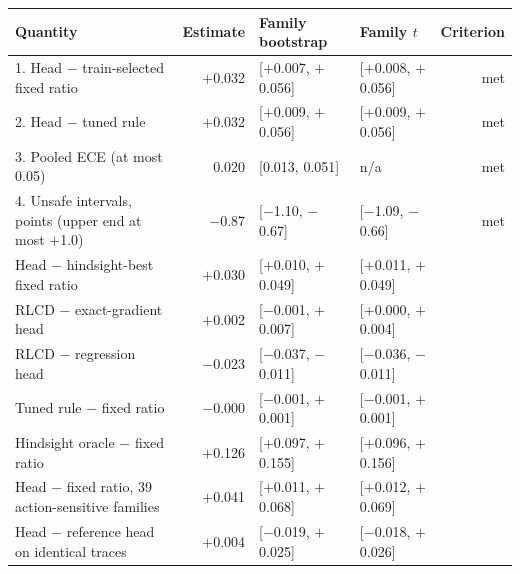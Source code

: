 \begin{tabular}{lrllr}
\toprule
Quantity & Estimate & Family bootstrap & Family $t$ & Criterion \\
\midrule
1. Head $-$ train-selected fixed ratio & $+$0.032 & [$+$0.007, $+$0.056] & [$+$0.008, $+$0.056] & met \\
2. Head $-$ tuned rule & $+$0.032 & [$+$0.009, $+$0.056] & [$+$0.009, $+$0.056] & met \\
3. Pooled ECE (at most 0.05) & 0.020 & [0.013, 0.051] & n/a & met \\
4. Unsafe intervals, points (upper end at most $+$1.0) & $-$0.87 & [$-$1.10, $-$0.67] & [$-$1.09, $-$0.66] & met \\
\midrule
Head $-$ hindsight-best fixed ratio & $+$0.030 & [$+$0.010, $+$0.049] & [$+$0.011, $+$0.049] &  \\
RLCD $-$ exact-gradient head & $+$0.002 & [$-$0.001, $+$0.007] & [$+$0.000, $+$0.004] &  \\
RLCD $-$ regression head & $-$0.023 & [$-$0.037, $-$0.011] & [$-$0.036, $-$0.011] &  \\
Tuned rule $-$ fixed ratio & $-$0.000 & [$-$0.001, $+$0.001] & [$-$0.001, $+$0.001] &  \\
Hindsight oracle $-$ fixed ratio & $+$0.126 & [$+$0.097, $+$0.155] & [$+$0.096, $+$0.156] &  \\
Head $-$ fixed ratio, 39 action-sensitive families & $+$0.041 & [$+$0.011, $+$0.068] & [$+$0.012, $+$0.069] &  \\
Head $-$ reference head on identical traces & $+$0.004 & [$-$0.019, $+$0.025] & [$-$0.018, $+$0.026] &  \\
\bottomrule
\end{tabular}
